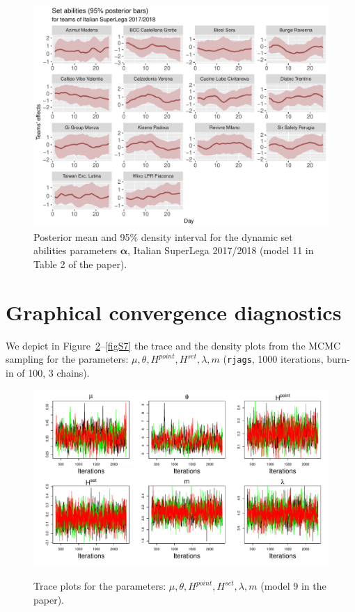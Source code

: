 \documentclass{statsoc}
\numberwithin{figure}{section}
\numberwithin{table}{section}
\begin{document}
 
\begin{figure}[h!]
\centering
\includegraphics[scale=0.75]{Dynamics/NegBin_ZIP_dynamicset_abilities.pdf}
\caption{Posterior mean and 95\% density interval for the dynamic set abilities parameters $\bm{\alpha}$, Italian SuperLega 2017/2018 (model 11 in Table 2 of the paper).}
\label{fig16}
\end{figure}

\clearpage 
\newpage 
\section{Graphical convergence diagnostics}

We depict in Figure~\ref{figS6}--\ref{figS7} the trace and the density plots from the MCMC sampling for the parameters: $\mu, \theta, H^{point}, H^{set},\lambda, m$ (\texttt{rjags}, 1000 iterations, burn-in of 100, 3 chains).

\begin{figure}[h!]
\centering
\includegraphics[scale=0.6]{Traceplots/Traceplots.pdf}\\
\caption{Trace plots for the parameters: $\mu, \theta, H^{point}, H^{set},\lambda, m$ (model 9 in the paper).}
\label{figS6}
\end{figure}
\end{document}
